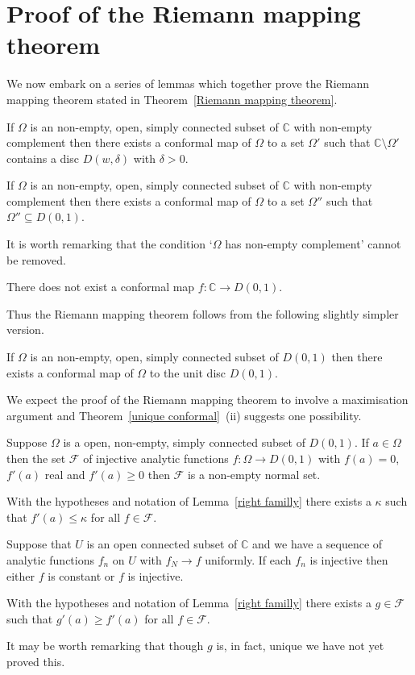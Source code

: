 \section{Proof of the Riemann mapping theorem}
We now embark on a series of lemmas which together
prove the Riemann mapping theorem
stated in Theorem~\ref{Riemann mapping theorem}.
\begin{lemma}
If $\Omega$ is an non-empty, open, simply connected subset
of $\mathbb C$ with non-empty complement
then there exists a conformal
map of $\Omega$ to a set $\Omega'$
such that ${\mathbb C}\setminus\Omega'$ 
contains a disc $D(w,\delta)$ with $\delta>0$.
\end{lemma}
\begin{lemma}
If $\Omega$ is an non-empty, open, simply connected subset
of $\mathbb C$ with non-empty complement
then there exists a conformal
map of $\Omega$ to a set $\Omega''$
such that $\Omega''\subseteq D(0,1)$. 
\end{lemma}
It is worth remarking that the condition
`$\Omega$ has non-empty complement' cannot be removed.
\begin{lemma} There does not exist a conformal map
$f:{\mathbb C}\rightarrow D(0,1)$.
\end{lemma}
Thus the Riemann mapping theorem follows from
the following slightly simpler version.
\begin{lemma}
If $\Omega$ is an non-empty,
open, simply connected subset
of $D(0,1)$
then there exists a conformal
map of $\Omega$ to the unit disc $D(0,1)$.
\end{lemma}

We expect the proof of the Riemann mapping theorem
to involve a maximisation argument and
Theorem~\ref{unique conformal}~(ii) suggests
one possibility.
\begin{lemma}\label{right familly}
Suppose $\Omega$ is a open, non-empty,
simply connected subset of $D(0,1)$.
If $a\in \Omega$ then the set ${\mathcal F}$
of injective
analytic functions $f:\Omega\rightarrow D(0,1)$
with $f(a)=0$, $f'(a)$ real and $f'(a)\geq 0$
then $\mathcal{F}$ is a non-empty normal set.
\end{lemma}
\begin{lemma} With the hypotheses and notation
of Lemma~\ref{right familly} there exists a
$\kappa$ such that $f'(a)\leq\kappa$ for
all $f\in\mathcal{F}$.
\end{lemma}
\begin{lemma} Suppose that $U$ is an open connected subset
of $\mathbb{C}$ and we have a sequence
of analytic functions $f_{n}$ on $U$ with $f_{N}\rightarrow f$
uniformly. If each $f_{n}$ is injective then either
$f$ is constant or $f$ is injective.
\end{lemma}
\begin{lemma} With the hypotheses and notation
of Lemma~\ref{right familly} there exists 
a $g\in\mathcal{F}$ such that $g'(a)\geq f'(a)$
for all $f\in\mathcal{F}$.
\end{lemma}
It may be worth remarking that though $g$ is, in fact,
unique we have not yet proved this.

